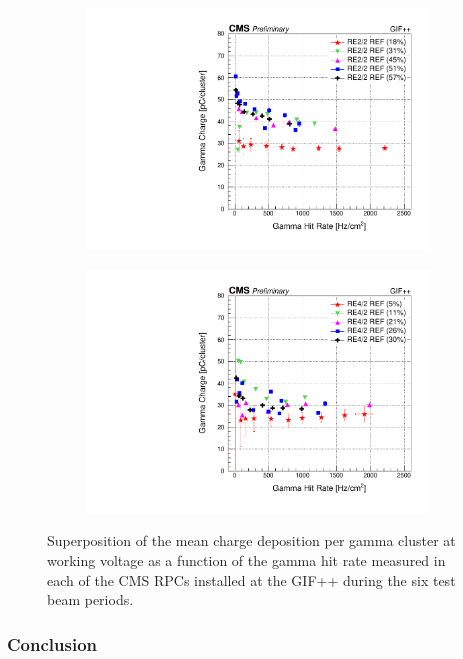 \begin{figure}[H]
\begin{subfigure}{0.5\linewidth}
    		\includegraphics[width = \linewidth]{fig/chapt5/RE2-2_REF_ClusterCharge_vs_Rate.pdf}
        	\caption{\label{fig:GIFpp_gcharge:C}}
    	\end{subfigure}
    	\begin{subfigure}{0.5\linewidth}
			\centering
    		\includegraphics[width = \linewidth]{fig/chapt5/RE4-2_REF_ClusterCharge_vs_Rate.pdf}
        	\caption{\label{fig:GIFpp_gcharge:D}}
    	\end{subfigure}
		\caption{\label{fig:GIFpp_gcharge} Superposition of the mean charge deposition per gamma cluster at working voltage as a function of the gamma hit rate measured in each of the CMS RPCs installed at the GIF++ during the six test beam periods.}
	\end{figure}
	
		\subsubsection{Conclusion}
		\label{chapt5:sssec:conclusion}
	
